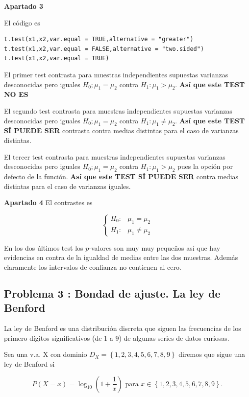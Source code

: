 \documentclass[
]{article}
\begin{document}
\textbf{Apartado 3}

El código es

\begin{verbatim}
t.test(x1,x2,var.equal = TRUE,alternative = "greater")
t.test(x1,x2,var.equal = FALSE,alternative = "two.sided")
t.test(x1,x2,var.equal = TRUE)
\end{verbatim}

El primer test contrasta para muestras independientes supuestas
varianzas desconocidas pero iguales \(H_0;\mu_1=\mu_2\) contra
\(H_1:\mu_1>\mu_2\). \textbf{Así que este TEST NO ES}

El segundo test contrasta para muestras independientes supuestas
varianzas desconocidas pero iguales \(H_0;\mu_1=\mu_2\) contra
\(H_1:\mu_1\not=\mu_2\). \textbf{Así que este TEST SÍ PUEDE SER}
contrasta contra medias distintas para el caso de varianzas distintas.

El tercer test contrasta para muestras independientes supuestas
varianzas desconocidas pero iguales \(H_0;\mu_1=\mu_2\) contra
\(H_1:\mu_1>\mu_2\) pues la opción por defecto de la función.
\textbf{Así que este TEST SÍ PUEDE SER} contra medias distintas para el
caso de varianzas iguales.

\textbf{Apartado 4} El contrastes es

\[\left\{\begin{array}{ll}H_0: & \mu_1=\mu_2\\ H_1: & \mu_1\not=\mu_2\end{array}\right.
\]

En los dos últimos test los \(p\)-valores son muy muy pequeños así que
hay evidencias en contra de la igualdad de medias entre las dos
muestras. Además claramente los intervalos de confianza no contienen al
cero.

\hypertarget{problema-3-bondad-de-ajuste.-la-ley-de-benford}{%
\subsection{Problema 3 : Bondad de ajuste. La ley de
Benford}\label{problema-3-bondad-de-ajuste.-la-ley-de-benford}}

La ley de Benford es una distribución discreta que siguen las
frecuencias de los primero dígitos significativos (de 1 a 9) de algunas
series de datos curiosas.

Sea una v.a. X con dominio \(D_X=\left\{1,2,3,4,5,6,7,8,9\right\}\)
diremos que sigue una ley de Benford si

\[P(X=x)=\log_{10} \left(1+\frac{1}{x}\right)\mbox{ para } x\in \left\{1,2,3,4,5,6,7,8,9\right\}.\]
\end{document}
